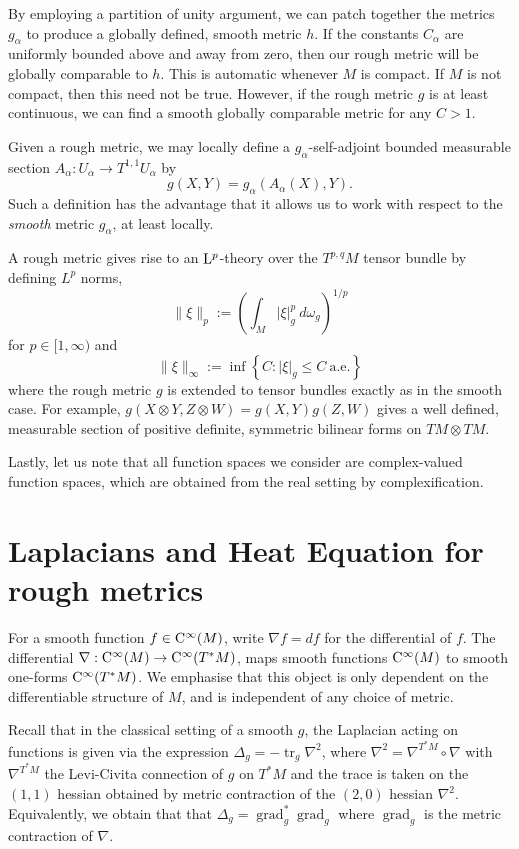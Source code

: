 \documentclass[a4paper, 12pt]{amsart}
\numberwithin{equation}{section}
\renewcommand{\~}{\tilde}
\renewcommand{\-}{\bar}
\newcommand{\8}{\infty}
\DeclareMathOperator{\grad}{grad}
\newcommand{\dbrac}[1]{\left\{#1\right\}}
\newcommand{\set}[1]{\dbrac{#1}}
\newcommand{\comp}{\circ}
\DeclareMathOperator{\tr}{tr}			%
\newcommand{\Lp}[2][{}]{{\rm L}^{#2}_{\rm #1}}		%
\newcommand{\Ck}[2][{}]{{\rm C}^{#2}_{\rm #1}}		%
\begin{document}
\begin{rem}
By employing a partition of unity argument, we can patch together the metrics \(g_{\alpha}\) to produce a globally defined, smooth metric \(h\). If the constants \(C_{\alpha}\) are uniformly bounded above and away from zero, then our rough metric will be globally comparable to \(h\). This is automatic whenever \(M\) is compact. If \(M\) is not compact, then this need not be true.
However, if the rough metric $g$ is at least continuous, we can find a smooth globally comparable metric for any $C > 1$. 
\end{rem}

Given a rough metric, we may locally define a \(g_{\alpha}\)-self-adjoint bounded measurable section \(A_{\alpha} : U_{\alpha} \to T^{1,1}U_{\alpha}\) by
\[
g(X, Y) = g_{\alpha} (A_{\alpha} (X), Y).
\]
Such a definition has the advantage that it allows us to work with respect to the \emph{smooth} metric \(g_{\alpha}\), 
at least locally.

A rough metric gives rise to an $\Lp{p}$-theory over the $T^{p,q}M$ tensor bundle by defining \(L^p\) norms,
\[
\|\xi\|_p := \left(\int_{M} |\xi|_{g}^p\ d\omega_g\right)^{1/p}
\]
for $p \in [1, \infty)$ and
\[
\|\xi\|_{\infty} := \inf\set{C: |\xi|_g \leq C\ \text{a.e.}}
\]
where the rough metric \(g\) is extended to tensor bundles exactly as in the smooth case. For example, \(g(X \otimes Y, Z \otimes W) = g(X, Y) g(Z, W)\) gives a well defined, measurable section of positive definite, symmetric bilinear forms on \(TM \otimes TM\).

Lastly, let us note that all function spaces we consider are complex-valued function spaces, which are obtained from the real setting by complexification.


\section{Laplacians and Heat Equation for rough metrics}


For a smooth function \(f \in \Ck{\infty}(M)\), write \(\nabla f = df\) for the differential of \(f\). 
The differential \(\nabla : \Ck{\infty}(M) \to \Ck{\infty}(T^{\ast} M)\), maps smooth functions 
\(\Ck{\infty}(M)\) to smooth one-forms \(\Ck{\infty}(T^{\ast} M)\). 
We emphasise that this object is only dependent on the differentiable structure of $M$, and is independent of any choice of metric.

Recall that in the classical setting of a smooth $g$,  the Laplacian acting on functions is given  via the expression $\Delta_g = - \tr_g \nabla^2$, where $\nabla^2 = \nabla^{T^\ast M} \comp \nabla$
with $\nabla^{T^\ast M}$ the Levi-Civita connection of $g$ on \(T^{\ast} M\) and the trace is taken on the \((1,1)\) hessian obtained by metric contraction of the \((2, 0)\) hessian \(\nabla^2\). Equivalently, we obtain that  that \(\Delta_g = \grad_g^\ast \grad_g\) where \(\grad_g\) is the metric contraction of \(\nabla\).
\end{document}
